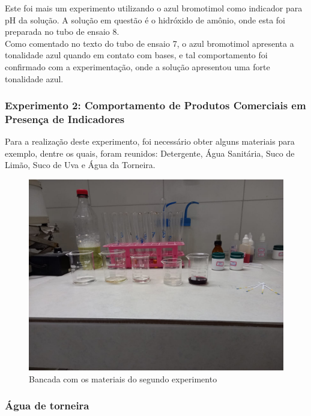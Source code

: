     	\indent Este foi mais um experimento utilizando o azul bromotimol como indicador para pH da solução. A solução em questão é o hidróxido de amônio, onde esta foi preparada no tubo de ensaio 8. \\
    	
    	\indent Como comentado no texto do tubo de ensaio 7, o azul bromotimol apresenta a tonalidade azul quando em contato com bases, e tal comportamento foi confirmado com a experimentação, onde a solução apresentou uma forte tonalidade azul.

        \newpage
        
        \subsubsection{Experimento 2: Comportamento de Produtos Comerciais em Presença de Indicadores}\label{subsubsec:mat_metodos_exp2}
        \indent Para a realização deste experimento, foi necessário obter alguns materiais para exemplo, dentre os quais, foram reunidos: Detergente, Água Sanitária, Suco de Limão, Suco de Uva e Água da Torneira.
        
        \begin{figure}[h]
        	\centering
        	\includegraphics[scale=0.25]{pictures/bancada.jpeg}
        	\caption{Bancada com os materiais do segundo experimento}
        	\label{fig: Bancada do segundo experimento}
        \end{figure}
    
        \subsubsection{Água de torneira}\label{exp2:aguatorneira}

